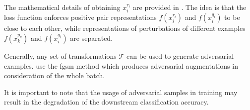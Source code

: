 The mathematical details of obtaining $x^{r_i}_i$ are provided in \citet{ho_contrastive_2020}.
The idea is that the loss function enforces 
positive pair representations $f(x^{r_i}_i)$ and $f(x^{q_i}_i)$ to be close to each other,
while representations of perturbations of different examples $f(x^{p_k}_k)$ and $f(x^{q_i}_i)$ are separated.

Generally, any set of transformations $\mathcal{T}$ can be used to generate adversarial examples.
\citeauthor{ho_contrastive_2020} use the \ac{fgsm} method which 
produces adversarial augmentations in consideration of the whole batch.

It is important to note that the usage of adversarial samples in training may result in 
the degradation of the downstream classification accuracy.